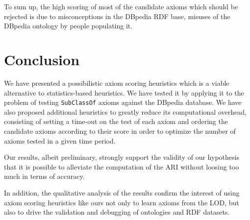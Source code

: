 \documentclass[conference]{IEEEtran}
\begin{document}
To sum up, the high scoring of most of the candidate axioms which should be rejected is due to misconceptions in the DBpedia RDF base, misuses of the DBpedia ontology by people populating it.




\section{Conclusion}\label{conclusion}

We have presented a possibilistic axiom scoring heuristics which is a viable
alternative to statistics-based heuristics. We have tested it by applying it to the
problem of testing \texttt{SubClassOf} axioms against the DBpedia database.
We have also proposed additional heuristics to greatly reduce its computational
overhead, consisting of setting a time-out on the test of each axiom and ordering the candidate axioms according to their score in order to optimize the number of axioms tested in a given time period.

Our results, albeit preliminary, strongly support the validity of our hypothesis
that it is possible to alleviate the computation of the ARI without loosing too much
in terms of accuracy.

In addition, the qualitative analysis of the results confirm the interest of using axiom scoring heuristics like ours
not only to learn axioms from the LOD, but also to drive the validation and debugging of ontologies and RDF datasets.









\end{document}

